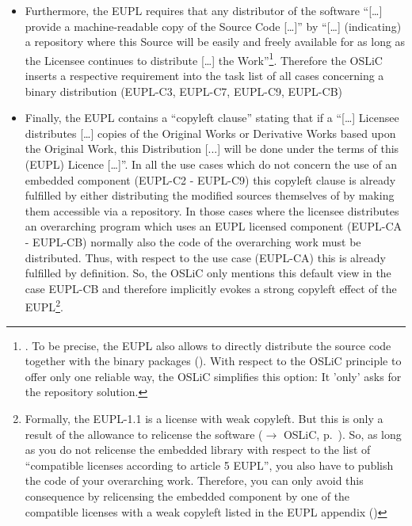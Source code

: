 \begin{itemize}
  \item Furthermore, the EUPL requires that any distributor of the software
  \enquote{[\ldots] provide a machine-readable copy of the Source Code [\ldots]}
  by \enquote{[\ldots] (indicating) a repository where this Source will be
  easily and freely available for as long as the Licensee continues to
  distribute [\ldots] the Work}\footnote{\cite[cf.][\nopage wp.\
  §5]{EuplLicense2007en}. To be precise, the EUPL also allows to directly
  distribute the source code together with the binary packages
  (\cite[cf.][\nopage wp.\ §3]{EuplLicense2007en}). With respect to the OSLiC
  principle to offer only one reliable way, the OSLiC simplifies this option:
  It 'only' asks for the repository solution.}. Therefore the OSLiC inserts a
  respective requirement into the task list of all cases concerning a binary
  distribution  (EUPL-C3, EUPL-C7, EUPL-C9, EUPL-CB)
  
  \item Finally, the EUPL contains a \enquote{copyleft clause} stating that if a
  \enquote{[\ldots] Licensee distributes [\ldots] copies of the Original Works
  or Derivative Works based upon the Original Work, this Distribution [...] will
  be done under the terms of this (EUPL) Licence [\ldots]}. In all the use cases
  which do not concern the use of an embedded component (EUPL-C2 - EUPL-C9) this
  copyleft clause is already fulfilled by either distributing the modified
  sources themselves of by making them accessible via a repository. In those
  cases where the licensee distributes an overarching program which uses an EUPL
  licensed component (EUPL-CA - EUPL-CB) normally also the code of the overarching
  work must be distributed. Thus, with respect to the use case (EUPL-CA) this is
  already fulfilled by definition. So, the OSLiC only mentions this default view
  in the case EUPL-CB and therefore implicitly evokes a strong copyleft effect of
  the EUPL\footnote{Formally, the EUPL-1.1 is a license with weak copyleft. But
  this is only a result of the allowance to relicense the software
  ($\rightarrow$ OSLiC, p.\ \pageref{sec:ProtectingPowerOfEupl}). So, as long as
  you do not relicense the embedded library with respect to the list of
  \enquote{compatible licenses according to article 5 EUPL}, you also have to
  publish the code of your overarching work. Therefore, you can only avoid this
  consequence by relicensing the embedded component by one of the compatible
  licenses with a weak copyleft listed in the EUPL appendix (\cite[cf.][\nopage
  wp §5 and Appendix]{EuplLicense2007en})}.
  

\end{itemize}








%
